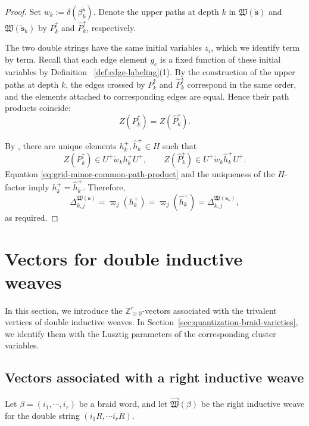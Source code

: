 \documentclass[12pt, reqno]{amsart}
\theoremstyle{plain}
\theoremstyle{definition}
\numberwithin{equation}{section}
\newcommand{\ZZ}{\mathbb{Z}}
\begin{document}
\begin{proof}
Set
\(
    w_k:=\delta(\beta_k^{\ddot{\mathbf s}}).
\)
Denote the upper paths at depth \(k\) in
\(\mathfrak W(\ddot{\mathbf s})\) and
\(\mathfrak W(\ddot{\mathbf s}_k)\) by
\(P_k^\uparrow\) and \(\widehat P_k^\uparrow\), respectively.

The two double strings have the same initial variables $z_i$, which we
identify term by term. Recall that each edge element \(g_e\) is a
fixed function of these initial variables by Definition ~\ref{def:edge-labeling}(1). By the construction of
the upper paths at depth \(k\), the edges crossed by
\(P_k^\uparrow\) and \(\widehat P_k^\uparrow\) correspond in the
same order, and the elements attached to corresponding edges are
equal. Hence their path products coincide:
\begin{equation}\label{eq:grid-minor-common-path-product}
    Z(P_k^\uparrow)
    =
    Z(\widehat P_k^\uparrow).
\end{equation}

By \cite[Definition~4.20 and Lemma~4.24]
{casals2025comparing}, there are unique elements
\(h_k^+,\widehat h_k^+\in H\) such that
\[
    Z(P_k^\uparrow)
    \in U^+\dot w_kh_k^+U^+,
    \qquad
    Z(\widehat P_k^\uparrow)
    \in U^+\dot w_k\widehat h_k^+U^+.
\]
Equation \eqref{eq:grid-minor-common-path-product} and the uniqueness
of the \(H\)-factor imply
\(    h_k^+=\widehat h_k^+.
\)
Therefore,
\[
    \Delta_{k,j}^{\mathfrak W(\ddot{\mathbf s})}
    =
    \varpi_j(h_k^+)
    =
    \varpi_j(\widehat h_k^+)
    =
    \Delta_{k,j}^{\mathfrak W(\ddot{\mathbf s}_k)},
\]
as required.
\end{proof}


\section{Vectors for double inductive weaves}
\label{sec:vector-right-weave}
In this section, we introduce the \(\ZZ_{\geq0}^r\)-vectors associated
with the trivalent vertices of double inductive weaves. In
Section~\ref{sec:quantization-braid-varieties}, we identify them with
the Lusztig parameters of the corresponding cluster variables.

\subsection{Vectors associated with a right inductive weave}
Let $\beta=(i_1,\cdots, i_r)$ be a braid word, and let $\overrightarrow{\mathfrak{W}}(\beta)$ be the right inductive weave for the double string $(i_1R,\cdots i_r R)$.
\end{document}
